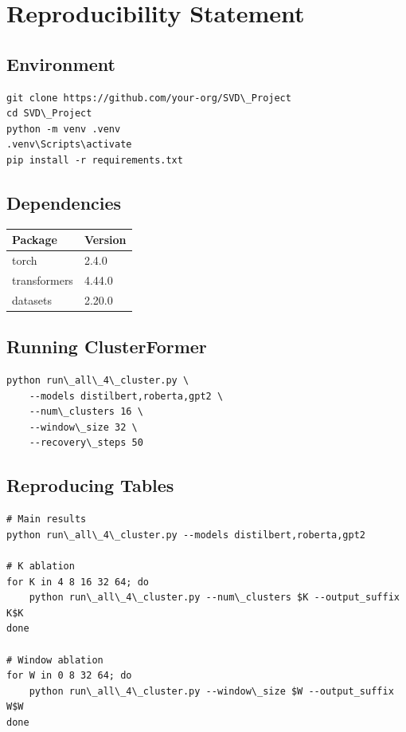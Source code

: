 \section{Reproducibility Statement}

\subsection{Environment}

\begin{lstlisting}
git clone https://github.com/your-org/SVD\_Project
cd SVD\_Project
python -m venv .venv
.venv\Scripts\activate
pip install -r requirements.txt
\end{lstlisting}

\subsection{Dependencies}

\begin{table}[H]
\centering
\small
\begin{tabular}{ll}
\toprule
\textbf{Package} & \textbf{Version} \\
\midrule
torch & 2.4.0 \\
transformers & 4.44.0 \\
datasets & 2.20.0 \\
\bottomrule
\end{tabular}
\end{table}

\subsection{Running ClusterFormer}

\begin{lstlisting}
python run\_all\_4\_cluster.py \
    --models distilbert,roberta,gpt2 \
    --num\_clusters 16 \
    --window\_size 32 \
    --recovery\_steps 50
\end{lstlisting}

\subsection{Reproducing Tables}

\begin{lstlisting}
# Main results
python run\_all\_4\_cluster.py --models distilbert,roberta,gpt2

# K ablation
for K in 4 8 16 32 64; do
    python run\_all\_4\_cluster.py --num\_clusters $K --output_suffix K$K
done

# Window ablation
for W in 0 8 32 64; do
    python run\_all\_4\_cluster.py --window\_size $W --output_suffix W$W
done
\end{lstlisting}

